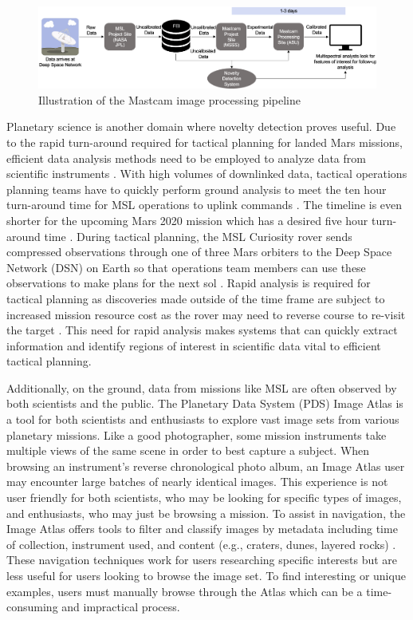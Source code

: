 \begin{figure}
\centering
\includegraphics[width=\linewidth]{figs/msl/DSN.png}
\caption[Mastcam Image Processing Pipeline]{Illustration of the Mastcam image processing pipeline \protect\parencite{kerner2020comparison}}
\label{msl/fig:timeline}
\end{figure}

Planetary science is another domain where novelty detection proves useful. 
Due to the rapid turn-around required for tactical planning for landed Mars missions, efficient data analysis methods need to be employed to analyze data from scientific instruments \parencite{bell2019tactical}.
With high volumes of downlinked data, tactical operations planning teams have to quickly perform ground analysis to meet the ten hour turn-around time for MSL operations to uplink commands \parencite{samuels2013preparation}. 
The timeline is even shorter for the upcoming Mars 2020 mission which has a desired five hour turn-around time \parencite{wilson2017nasa}.
During tactical planning, the MSL Curiosity rover sends compressed observations through one of three Mars orbiters to the Deep Space Network (DSN) on Earth so that operations team members can use these observations to make plans for the next sol \parencite{kerner_multispec}.
Rapid analysis is required for tactical planning as discoveries made outside of the time frame are subject to increased mission resource cost as the rover may need to reverse course to re-visit the target \parencite{kerner2020comparison}.
This need for rapid analysis makes systems that can quickly extract information and identify regions of interest in scientific data vital to efficient tactical planning. 

Additionally, on the ground, data from missions like MSL are often observed by both scientists and the public.
The Planetary Data System (PDS) Image Atlas is a tool for both scientists and enthusiasts to explore vast image sets from various planetary missions. 
Like a good photographer, some mission instruments take multiple views of the same scene in order to best capture a subject. 
When browsing an instrument's reverse chronological photo album, an Image Atlas user may encounter large batches of nearly identical images. 
This experience is not user friendly for both scientists, who may be looking for specific types of images, and enthusiasts, who may just be browsing a mission. 
To assist in navigation, the Image Atlas offers tools to filter and classify images by metadata including time of collection, instrument used, and content (e.g., craters, dunes, layered rocks) \cite{wagstaff2018deep}.
These navigation techniques work for users researching specific interests but are less useful for users looking to browse the image set. 
To find interesting or unique examples, users must manually browse through the Atlas which can be a time-consuming and impractical process.


